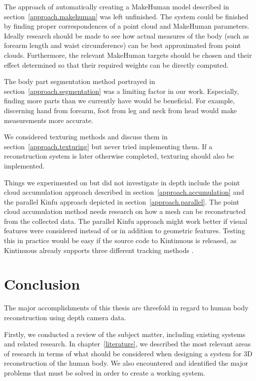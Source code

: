 The approach of automatically creating a MakeHuman model described in section~\ref{approach.makehuman} was left unfinished. The system could be finished by finding proper correspondences of a point cloud and MakeHuman parameters. Ideally research should be made to see how actual measures of the body (such as forearm length and waist circumference) can be best approximated from point clouds. Furthermore, the relevant MakeHuman targets should be chosen and their effect determined so that their required weights can be directly computed.

The body part segmentation method portrayed in section~\ref{approach.segmentation} was a limiting factor in our work. Especially, finding more parts than we currently have would be beneficial. For example, discerning hand from forearm, foot from leg and neck from head would make measurements more accurate.

We considered texturing methods and discuss them in section~\ref{approach.texturing} but never tried implementing them. If a reconstruction system is later otherwise completed, texturing should also be implemented.

Things we experimented on but did not investigate in depth include the point cloud accumulation approach described in section~\ref{approach.accumulation} and the parallel Kinfu approach depicted in section~\ref{approach.parallel}. The point cloud accumulation method needs research on how a mesh can be reconstructed from the collected data. The parallel Kinfu approach might work better if visual features were considered instead of or in addition to geometric features. Testing this in practice would be easy if the source code to Kintinuous is released, as Kintinuous already supports three different tracking methods \citep{Whelan12rssw}.



\section{Conclusion}

The major accomplishments of this thesis are threefold in regard to human body reconstruction using depth camera data.

Firstly, we conducted a review of the subject matter, including existing systems and related research. In chapter~\ref{literature}, we described the most relevant areas of research in terms of what should be considered when designing a system for 3D reconstruction of the human body. We also encountered and identified the major problems that must be solved in order to create a working system.

